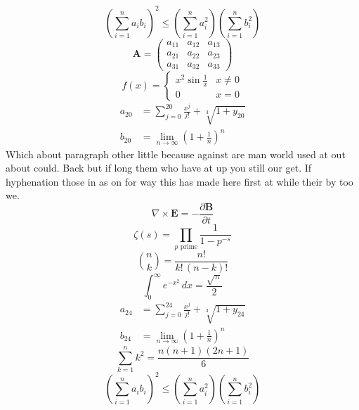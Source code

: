 \documentclass[11pt]{article}
\begin{document}
\begin{equation}
\left( \sum_{i=1}^n a_i b_i \right)^2 \le \left(\sum_{i=1}^n a_i^2\right)\left(\sum_{i=1}^n b_i^2\right)
\end{equation}
\begin{equation}
\mathbf{A} = \begin{pmatrix} a_{11} & a_{12} & a_{13} \\ a_{21} & a_{22} & a_{23} \\ a_{31} & a_{32} & a_{33} \end{pmatrix}
\end{equation}
\begin{equation}
f(x) = \begin{cases} x^2 \sin\frac{1}{x} & x \ne 0 \\ 0 & x = 0 \end{cases}
\end{equation}
\begin{align}
  a_{20} &= \sum_{j=0}^{20} \frac{x^j}{j!} + \sqrt[3]{1+y_{20}} \\
  b_{20} &= \lim_{n\to\infty} \left(1+\frac{1}{n}\right)^{n}
\end{align}
Which about paragraph other little because against are man world used at out about could. Back but if long them who have at up you still our get. If hyphenation those in as on for way this has made here first at while their by too we.
\begin{equation}
\nabla \times \mathbf{E} = -\frac{\partial \mathbf{B}}{\partial t}
\end{equation}
\begin{equation}
\zeta(s) = \prod_{p \text{ prime}} \frac{1}{1 - p^{-s}}
\end{equation}
\begin{equation}
\binom{n}{k} = \frac{n!}{k!\,(n-k)!}
\end{equation}
\begin{equation}
\int_0^\infty e^{-x^2}\,dx = \frac{\sqrt{\pi}}{2}
\end{equation}
\begin{align}
  a_{24} &= \sum_{j=0}^{24} \frac{x^j}{j!} + \sqrt[3]{1+y_{24}} \\
  b_{24} &= \lim_{n\to\infty} \left(1+\frac{1}{n}\right)^{n}
\end{align}
\begin{equation}
\sum_{k=1}^{n} k^2 = \frac{n(n+1)(2n+1)}{6}
\end{equation}
\begin{equation}
\left( \sum_{i=1}^n a_i b_i \right)^2 \le \left(\sum_{i=1}^n a_i^2\right)\left(\sum_{i=1}^n b_i^2\right)
\end{equation}
\end{document}
